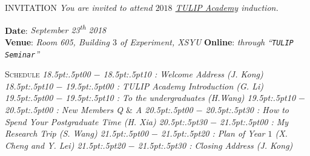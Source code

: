 \documentclass{article}
\begin{document}
%

\obeylines%

{ INVITATION}
\bigbreak
\textit{%
  You are invited to attend $2018$ \href{http://www.tulip.org.au}{TULIP Academy} induction.
}

\vspace{4pt}

{\scshape }

\textbf{Date}:  \textit{September 23\/\rlap{,}\textsuperscript{th} 2018} \\ %
\textbf{Venue}: \textit{Room 605, Building $3$ of Experiment, XSYU}
\textbf{Online}: \textit{through ``\texttt{TULIP Seminar}''}


\medbreak
{\scshape  Schedule}
\textit{%
\footnotesize{
  18\kern.5pt:\kern.5pt00 $-$ 18\kern.5pt:\kern.5pt10 : Welcome Address (J. Kong)
  18\kern.5pt:\kern.5pt10 $-$ 19\kern.5pt:\kern.5pt00 : TULIP Academy Introduction (G. Li)
  19\kern.5pt:\kern.5pt00 $-$ 19\kern.5pt:\kern.5pt10 : To the undergraduates (H.Wang)  
  19\kern.5pt:\kern.5pt10 $-$ 20\kern.5pt:\kern.5pt00 : New Members Q $\&$ A
  20\kern.5pt:\kern.5pt00 $-$ 20\kern.5pt:\kern.5pt30 : How to Spend Your Postgraduate Time (H. Xia)
  20\kern.5pt:\kern.5pt30 $-$ 21\kern.5pt:\kern.5pt00 : My Research Trip (S. Wang)
  21\kern.5pt:\kern.5pt00 $-$ 21\kern.5pt:\kern.5pt20 : Plan of Year $1$ (X. Cheng and Y. Lei)
  21\kern.5pt:\kern.5pt20 $-$ 21\kern.5pt:\kern.5pt30 : Closing Address (J. Kong)}
}
\end{document}
